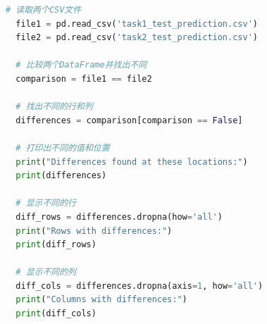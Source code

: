 \documentclass[12pt]{article}
\begin{document}
\begin{lstlisting}[language=Python]
  # 读取两个CSV文件
  file1 = pd.read_csv('task1_test_prediction.csv')
  file2 = pd.read_csv('task2_test_prediction.csv')
  
  # 比较两个DataFrame并找出不同
  comparison = file1 == file2
  
  # 找出不同的行和列
  differences = comparison[comparison == False]
  
  # 打印出不同的值和位置
  print("Differences found at these locations:")
  print(differences)
  
  # 显示不同的行
  diff_rows = differences.dropna(how='all')
  print("Rows with differences:")
  print(diff_rows)
  
  # 显示不同的列
  diff_cols = differences.dropna(axis=1, how='all')
  print("Columns with differences:")
  print(diff_cols)
\end{lstlisting}
\end{document}
